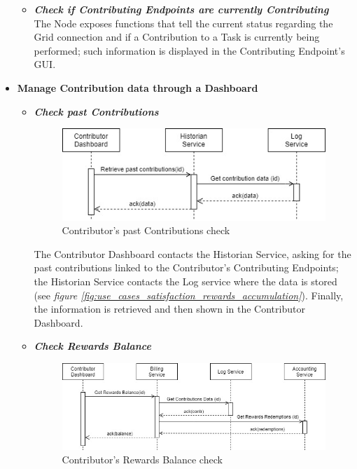 \begin{itemize}
\begin{itemize}
        \item \textbf{\textit{Check if Contributing Endpoints are currently Contributing}}\\
        The Node exposes functions that tell the current status regarding the Grid connection and if a Contribution to a Task is currently being performed; such information is displayed in the Contributing Endpoint's GUI.

    \end{itemize}
    \item \textbf{Manage Contribution data through a Dashboard}
    \begin{itemize}
        \item \textbf{\textit{Check past Contributions}}\\
        \begin{figure}[!ht]
            \centering
            \includegraphics[scale=0.65]{document/chapters/chapter_5/images/use_cases_satisfaction_past_contributions_check.jpg}
            \caption{Contributor's past Contributions check}
            \label{fig:use_cases_satisfaction_past_contributions_check}
        \end{figure}

        The Contributor Dashboard contacts the Historian Service, asking for the past contributions linked to the Contributor's Contributing Endpoints; the Historian Service contacts the Log service where the data is stored (see \textit{figure \ref{fig:use_cases_satisfaction_rewards_accumulation}}). Finally, the information is retrieved and then shown in the Contributor Dashboard.

        \item \textbf{\textit{Check Rewards Balance}}\\
        \begin{figure}[!ht]
            \centering
            \includegraphics[scale=0.6]{document/chapters/chapter_5/images/use_cases_satisfaction_rewards_balance.jpg}
            \caption{Contributor's Rewards Balance check}
            \label{fig:use_cases_satisfaction_rewards_balance}
        \end{figure}


\end{itemize}
\end{itemize}

